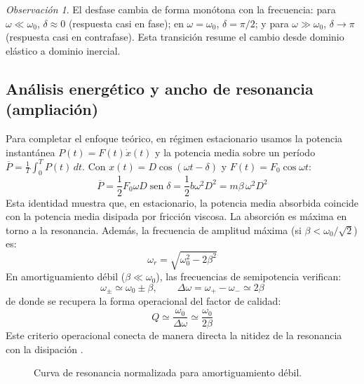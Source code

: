 \documentclass[12pt, a4paper]{article}
\theoremstyle{plain}
\theoremstyle{definition}
\theoremstyle{remark}
\newtheorem*{observacion}{Observación}
\DeclareMathOperator{\sen}{sen}
\begin{document}
\begin{observacion}
El desfase cambia de forma monótona con la frecuencia: para
$\omega\ll\omega_0$, $\delta\approx 0$ (respuesta casi en fase); en
$\omega=\omega_0$, $\delta=\pi/2$; y para $\omega\gg\omega_0$, $\delta\to\pi$
(respuesta casi en contrafase). Esta transición resume el cambio desde dominio elástico
a dominio inercial.
\end{observacion}

\subsection{Análisis energético y ancho de resonancia (ampliación)}

Para completar el enfoque teórico, en régimen estacionario usamos la potencia instantánea
$P(t)=F(t)\dot{x}(t)$ y la potencia media sobre un período
$\overline{P}=\frac{1}{T}\int_0^T P(t)\,dt$.
Con $x(t)=D\cos(\omega t-\delta)$ y $F(t)=F_0\cos\omega t$:
\begin{equation}
  \overline{P}
  =\frac{1}{2}F_0\omega D\sen\delta
  =\frac{1}{2}b\omega^2D^2
  =m\beta\,\omega^2D^2
\end{equation}
Esta identidad muestra que, en estacionario, la potencia media absorbida coincide con la
potencia media disipada por fricción viscosa. La absorción es máxima en torno a la
resonancia. Además, la frecuencia de amplitud máxima (si $\beta<\omega_0/\sqrt{2}$) es:
\begin{equation}
  \omega_r=\sqrt{\omega_0^2-2\beta^2}
\end{equation}
En amortiguamiento débil ($\beta\ll\omega_0$), las frecuencias de semipotencia verifican:
\begin{equation}
  \omega_\pm \simeq \omega_0 \pm \beta,\qquad
  \Delta\omega=\omega_+-\omega_-\simeq 2\beta
\end{equation}
de donde se recupera la forma operacional del factor de calidad:
\begin{equation}
  Q \simeq \frac{\omega_0}{\Delta\omega}\simeq \frac{\omega_0}{2\beta}
\end{equation}
Este criterio operacional conecta de manera directa la nitidez de la resonancia con la disipación
\cite{mit803_l6}.

\begin{figure}[H]
  \centering
  \caption{Curva de resonancia normalizada para amortiguamiento débil.}
\end{figure}
\end{document}
